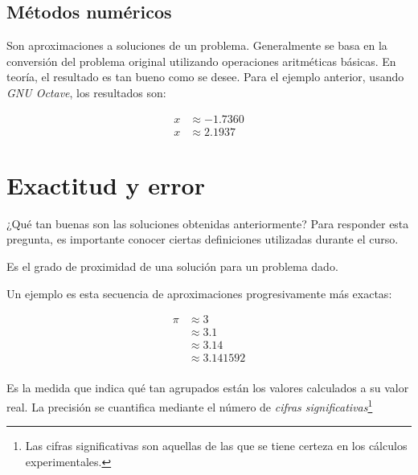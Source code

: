 \subsection{Métodos numéricos}

Son aproximaciones a soluciones de un problema. Generalmente se basa en
la conversión del problema original utilizando operaciones aritméticas
básicas. En teoría, el resultado es tan bueno como se desee. Para el
ejemplo anterior, usando \emph{GNU Octave}, los resultados son:

\begin{align*}
    x & \approx -1.7360 \\
    x & \approx 2.1937
\end{align*}

\section{Exactitud y error}

¿Qué tan buenas son las soluciones obtenidas anteriormente? Para
responder esta pregunta, es importante conocer ciertas definiciones
utilizadas durante el curso.

\begin{definition}[Exactitud]
    Es el grado de proximidad de una solución para un problema dado.


\end{definition}

\begin{eg}
    Un ejemplo es esta secuencia de aproximaciones progresivamente más exactas:

    \begin{align*} 
        \pi &\approx 3 \\ 
            &\approx 3.1 \\ 
            &\approx 3.14 \\ 
            &\approx 3.141592 \\ 
    \end{align*}

\end{eg}

\begin{definition}[Precisión]
    Es la medida que indica qué tan agrupados están los valores calculados a
    su valor real. La precisión se cuantifica mediante el número de
    \emph{cifras significativas}\footnote{Las cifras significativas son
    aquellas de las que se tiene certeza en los cálculos experimentales.}
\end{definition}


